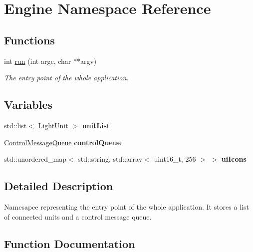\hypertarget{namespaceEngine}{}\section{Engine Namespace Reference}
\label{namespaceEngine}
\subsection*{Functions}
\begin{DoxyCompactItemize}
\item 
int \mbox{\hyperlink{namespaceEngine_a18825e7d28c8436bb36f3ca02b99d41f}{run}} (int argc, char $\ast$$\ast$argv)
\begin{DoxyCompactList}\small\item\em The entry point of the whole application. \end{DoxyCompactList}\end{DoxyCompactItemize}
\subsection*{Variables}
\begin{DoxyCompactItemize}
\item 
\mbox{\label{namespaceEngine_ac3baaa2258cdfbc45de266c5b5641454}} 
std\+::list$<$ \mbox{\hyperlink{classLightUnit}{Light\+Unit}} $>$ {\bfseries unit\+List}
\item 
\mbox{\label{namespaceEngine_a300dfed93e6ea0213f64e184373517ed}} 
\mbox{\hyperlink{classControlMessageQueue}{Control\+Message\+Queue}} {\bfseries control\+Queue}
\item 
\mbox{\label{namespaceEngine_ae562ecbc72c843b594695a058487d3cb}} 
std\+::unordered\+\_\+map$<$ std\+::string, std\+::array$<$ uint16\+\_\+t, 256 $>$ $>$ {\bfseries ui\+Icons}
\end{DoxyCompactItemize}


\subsection{Detailed Description}
Namesapce representing the entry point of the whole application. It stores a list of connected units and a control message queue. 

\subsection{Function Documentation}
\mbox{\label{namespaceEngine_a18825e7d28c8436bb36f3ca02b99d41f}} 
